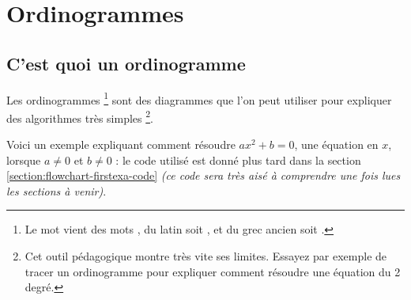 \documentclass[12pt,a4paper]{article}
\begin{document}
\newpage
\section{Ordinogrammes}

\subsection{C'est quoi un ordinogramme} \label{section:flowchart-firstexa}

Les ordinogrammes
\footnote{
    Le mot  vient des mots , du latin  soit , et du grec ancien  soit .
}
sont des diagrammes que l'on peut utiliser pour expliquer des algorithmes très simples
\footnote{
    Cet outil pédagogique montre très vite ses limites. Essayez par exemple de tracer un ordinogramme pour expliquer comment résoudre une équation du 2\ieme{} degré.
}.

\medskip


Voici un exemple expliquant comment résoudre $a x^2 + b = 0$, une équation en $x$, lorsque $a \neq 0$ et $b \neq 0$ : le code utilisé est donné plus tard dans la section \ref{section:flowchart-firstexa-code} \emph{(ce code sera très aisé à comprendre une fois lues les sections à venir)}.

\begin{center}
    \small
    
\end{center}
\end{document}
